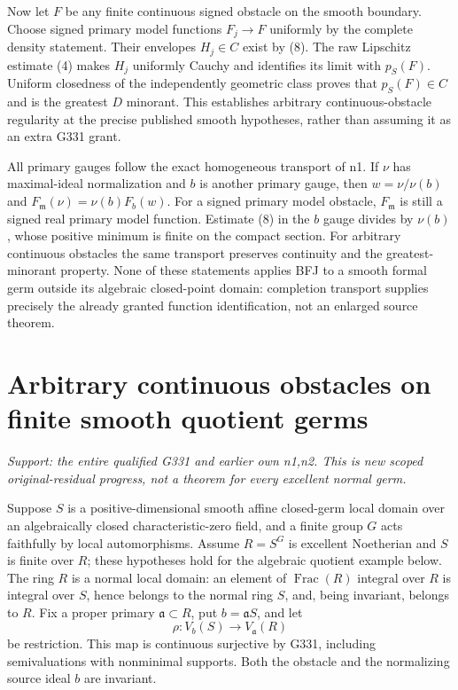\documentclass[11pt]{article}
\begin{document}
Now let $F$ be any finite continuous signed obstacle on the smooth boundary. Choose signed primary model functions $F_j\to F$ uniformly by the complete density statement. Their envelopes $H_j\in C$ exist by (8). The raw Lipschitz estimate (4) makes $H_j$ uniformly Cauchy and identifies its limit with $p_S(F)$. Uniform closedness of the independently geometric class proves that $p_S(F)\in C$ and is the greatest $D$ minorant. This establishes arbitrary continuous-obstacle regularity at the precise published smooth hypotheses, rather than assuming it as an extra G331 grant.

All primary gauges follow the exact homogeneous transport of n1. If $\nu$ has maximal-ideal normalization and $b$ is another primary gauge, then $w=\nu/\nu(b)$ and $F_{\mathfrak m}(\nu)=\nu(b)F_b(w)$. For a signed primary model obstacle, $F_{\mathfrak m}$ is still a signed real primary model function. Estimate (8) in the $b$ gauge divides by $\nu(b)$, whose positive minimum is finite on the compact section. For arbitrary continuous obstacles the same transport preserves continuity and the greatest-minorant property. None of these statements applies BFJ to a smooth formal germ outside its algebraic closed-point domain: completion transport supplies precisely the already granted function identification, not an enlarged source theorem.


\section{Arbitrary continuous obstacles on finite smooth quotient germs}
\label{sec:quotient}
\textit{Support: the entire qualified G331 and earlier own n1,n2. This is new scoped original-residual progress, not a theorem for every excellent normal germ.}

Suppose $S$ is a positive-dimensional smooth affine closed-germ local domain over an algebraically closed characteristic-zero field, and a finite group $G$ acts faithfully by local automorphisms. Assume $R=S^G$ is excellent Noetherian and $S$ is finite over $R$; these hypotheses hold for the algebraic quotient example below. The ring $R$ is a normal local domain: an element of $\operatorname{Frac}(R)$ integral over $R$ is integral over $S$, hence belongs to the normal ring $S$, and, being invariant, belongs to $R$. Fix a proper primary $\mathfrak a\subset R$, put $b=\mathfrak aS$, and let
\[
 \rho:V_b(S)\longrightarrow V_{\mathfrak a}(R)
\]
be restriction. This map is continuous surjective by G331, including semivaluations with nonminimal supports. Both the obstacle and the normalizing source ideal $b$ are invariant.
\end{document}
